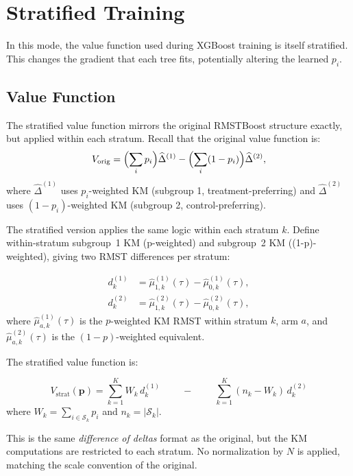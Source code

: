 \documentclass[11pt,letterpaper]{article}
\begin{document}
\section{Stratified Training}
\label{sec:strat-train}

In this mode, the value function used during XGBoost training is itself
stratified.  This changes the gradient that each tree fits, potentially
altering the learned $p_i$.

\subsection{Value Function}

The stratified value function mirrors the original RMSTBoost structure
exactly, but applied within each stratum.  Recall that the original
value function is:
\[
V_{\text{orig}} = \Bigl(\sum_i p_i\Bigr)\widehat\Delta^{(1)}
                - \Bigl(\sum_i (1-p_i)\Bigr)\widehat\Delta^{(2)},
\]
where $\widehat\Delta^{(1)}$ uses $p_i$-weighted KM (subgroup 1,
treatment-preferring) and $\widehat\Delta^{(2)}$ uses $(1-p_i)$-weighted
KM (subgroup 2, control-preferring).

The stratified version applies the same logic within each stratum $k$.
Define within-stratum subgroup~1 KM (p-weighted) and subgroup~2 KM
((1-p)-weighted), giving two RMST differences per stratum:

\begin{align*}
d_k^{(1)} &=
  \widehat\mu_{1,k}^{(1)}(\tau) - \widehat\mu_{0,k}^{(1)}(\tau),\\
d_k^{(2)} &=
  \widehat\mu_{1,k}^{(2)}(\tau) - \widehat\mu_{0,k}^{(2)}(\tau),
\end{align*}
where $\widehat\mu_{a,k}^{(1)}(\tau)$ is the $p$-weighted KM RMST within
stratum $k$, arm $a$, and $\widehat\mu_{a,k}^{(2)}(\tau)$ is the
$(1-p)$-weighted equivalent.

The stratified value function is:

\[
\boxed{
V_{\text{strat}}(\bm{p}) =
\sum_{k=1}^K W_k\, d_k^{(1)}
\;\;\;\;\;\;\;\;-
\;\;\;\;\;\;\;\;
\sum_{k=1}^K (n_k - W_k)\, d_k^{(2)}
}
\]
where $W_k = \sum_{i\in\mathcal{S}_k} p_i$ and $n_k = |\mathcal{S}_k|$.

This is the same \emph{difference of deltas} format as the original, but
the KM computations are restricted to each stratum.  No normalization by
$N$ is applied, matching the scale convention of the original.
\end{document}
